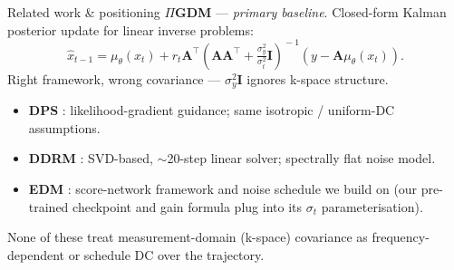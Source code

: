 \documentclass[aspectratio=169]{beamer}
\newcommand{\PIGDM}{$\Pi$GDM}
\begin{document}
\begin{frame}{Related work \& positioning}
  \textbf{\PIGDM{}} \cite{song2023pigdm} --- \emph{primary baseline}. Closed-form Kalman posterior update for linear inverse problems:
  \[
    \hat{x}_{t-1} = \mu_\theta(x_t) + r_t\mathbf{A}^\top\!\left(\mathbf{A}\mathbf{A}^\top + \tfrac{\sigma_y^2}{\sigma_t^2}\mathbf{I}\right)^{\!-1}\!(y - \mathbf{A}\mu_\theta(x_t)).
  \]
  Right framework, wrong covariance --- $\sigma_y^2\mathbf{I}$ ignores k-space structure.
  \vspace{0.4em}
  \begin{itemize}
    \item \textbf{DPS} \cite{chung2023dps}: likelihood-gradient guidance; same isotropic / uniform-DC assumptions.
    \item \textbf{DDRM} \cite{kawar2022ddrm}: SVD-based, $\sim$20-step linear solver; spectrally flat noise model.
    \item \textbf{EDM} \cite{karras2022edm}: score-network framework and noise schedule we build on (our pre-trained checkpoint and gain formula plug into its $\sigma_t$ parameterisation).
  \end{itemize}
  None of these treat measurement-domain (k-space) covariance as frequency-dependent or schedule DC over the trajectory.
\end{frame}
\end{document}
